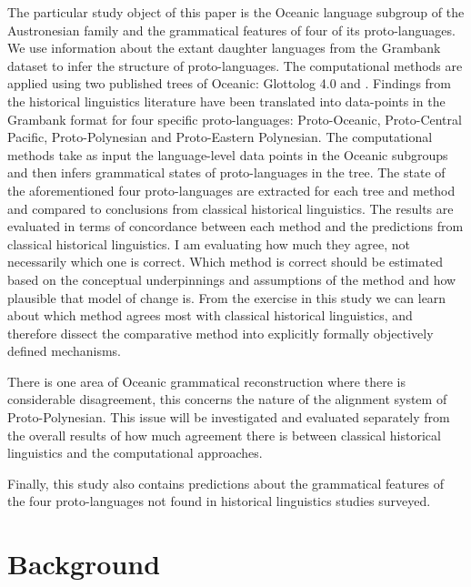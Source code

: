 \documentclass[a4paper,10pt]{article} %
\begin{document}
The particular study object of this paper is the Oceanic language subgroup of the Austronesian family and the grammatical features of four of its proto-languages. We use information about the extant daughter languages from the Grambank dataset \citep{grambankwebsite} to infer the structure of proto-languages. The computational methods are applied using two published trees of Oceanic: Glottolog 4.0 and \citet{grayetal_2009}. Findings from the historical linguistics literature have been translated into data-points in the Grambank format for four specific proto-languages: Proto-Oceanic, Proto-Central Pacific, Proto-Polynesian and Proto-Eastern Polynesian. The computational methods take as input the language-level data points in the Oceanic subgroups and then infers grammatical states of proto-languages in the tree. The state of the aforementioned four proto-languages are extracted for each tree and method and compared to conclusions from classical historical linguistics. The results are evaluated in terms of concordance between each method and the predictions from classical historical linguistics. I am evaluating how much they agree, not necessarily which one is correct. Which method is correct should be estimated based on the conceptual underpinnings and assumptions of the method and how plausible that model of change is. From the exercise in this study we can learn about which method agrees most with classical historical linguistics, and therefore dissect the comparative method into explicitly formally objectively defined mechanisms.

There is one area of Oceanic grammatical reconstruction where there is considerable disagreement, this concerns the nature of the alignment system of Proto-Polynesian. This issue will be investigated and evaluated separately from the overall results of how much agreement there is between classical historical linguistics and the computational approaches.

Finally, this study also contains predictions about the grammatical features of the four proto-languages not found in historical linguistics studies surveyed.



\section{Background}
\label{recon_grammar}
\end{document}
